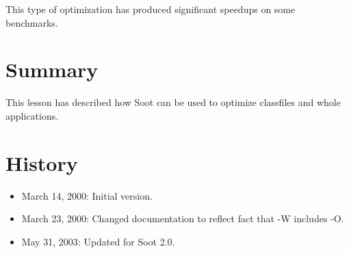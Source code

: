 \documentclass{article}
\begin{document}
This type of optimization has produced significant speedups on
some benchmarks.

\section{Summary}
This lesson has described how Soot can be used to optimize classfiles
and whole applications.

\section{History}
\begin{itemize}
\item March 14, 2000: Initial version.

\item March 23, 2000: Changed documentation to reflect fact that -W
includes -O.

\item May 31, 2003: Updated for Soot 2.0.
\end{itemize}
\end{document}
